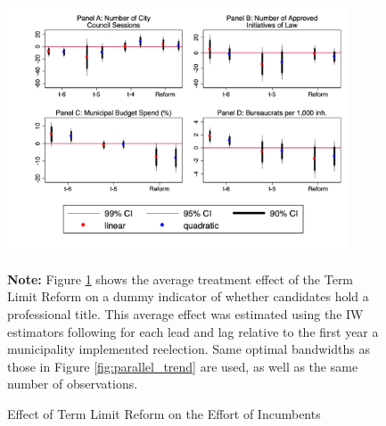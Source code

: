 \documentclass[12pt]{amsart}
\numberwithin{equation}{section}
\theoremstyle{definition}
\theoremstyle{definition}
\theoremstyle{definition}
\begin{document}
 \begin{figure}[h]   
\centering
 \caption{Effect of Term Limit Reform on the Effort of Incumbents}
 \label{fig:effort}
\includegraphics[width=0.9\textwidth]{../Figures_incumbency/effort_based_incumbency.png}
       \captionsetup{justification=centering}
         
 \textbf{Note:} Figure \ref{fig:effort} shows the average treatment effect of the Term Limit Reform on a dummy indicator of whether candidates hold a professional title. This average effect was estimated using the IW estimators following \citet{abraham_sun_2020} for each lead and lag relative to the first year a municipality implemented reelection. Same optimal bandwidths as those in Figure \ref{fig:parallel_trend} are used, as well as the same number of observations.  
 
\end{figure}    
   
\end{document}
